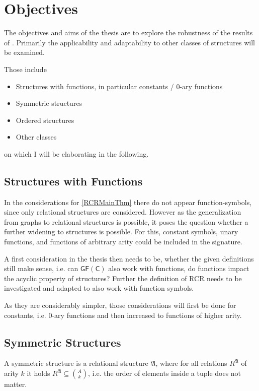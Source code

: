\documentclass[a4paper,11pt,DIV=15]{scrartcl} %
\theoremstyle{plain}
\theoremstyle{definition}
\begin{document}
\section{Objectives}
\label{Sec::Objectives}

The objectives and aims of the thesis are to explore the robustness of the results of \cite{scheidt2024color}. Primarily the applicability and adaptability to other classes of structures will be examined.

Those include
\begin{itemize}
	\item Structures with functions, in particular constants / $0$-ary functions
	\item Symmetric structures
	\item Ordered structures
	\item Other classes
\end{itemize}
on which I will be elaborating in the following.

\subsection{Structures with Functions}

In the considerations for \cref{RCRMainThm} there do not appear function-symbols, since only relational structures are considered.
However as the generalization from graphs to relational structures is possible, it poses the question whether a further widening to structures is possible.
For this, constant symbols, unary functions, and functions of arbitrary arity could be included in the signature.

A first consideration in the thesis then needs to be, whether the given definitions still make sense, i.e. can $\mathsf{GF(C)}$ also work with functions, do functions impact the acyclic property of structures?
Further the definition of RCR needs to be investigated and adapted to also work with function symbols.

As they are considerably simpler, those considerations will first be done for constants, i.e. $0$-ary functions and then increased to functions of higher arity.
\label{StructWFunc}

\subsection{Symmetric Structures}

A symmetric structure is a relational structure $\mathfrak A$, where for all relations $R^\mathfrak A$ of arity $k$ it holds $R^\mathfrak A \subseteq \binom{A}{k}$, i.e. the order of elements inside a tuple does not matter.
\end{document}
